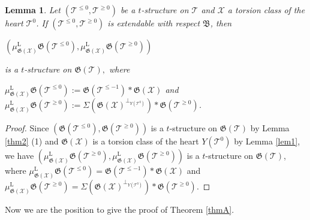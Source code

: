 \documentclass[11pt,a4paper]{amsart}
\numberwithin{equation}{section} \theoremstyle{plain}
\newtheorem{lem}{Lemma}[section]
\numberwithin{equation}{section} \theoremstyle{definition}
\begin{document}
\begin{lem}\label{lem3}  Let $(\mathcal{T}^{\leq0},\mathcal{T}^{\geq0})$ be a $t$-structure on $\mathcal{T}$ and $\mathcal{X}$ a torsion class of the heart $\mathcal{T}^{0}$. If $(\mathcal{T}^{\leq0},\mathcal{T}^{\geq0})$ is extendable with respect $\mathfrak{B}$, then
\begin{center}
$(\mu^{\mathrm{L}}_{\mathfrak{G}(\mathcal{X})}\mathfrak{G}(\mathcal{T}^{\leq0}),\mu^{\mathrm{L}}_{\mathfrak{G}(\mathcal{X})}\mathfrak{G}(\mathcal{T}^{\geq0}))$ \end{center}is a $t$-structure on $\mathfrak{G}(\mathcal{T}),$
where
\begin{center}
$\mu^{\mathrm{L}}_{\mathfrak{G}(\mathcal{X})}\mathfrak{G}(\mathcal{T}^{\leq0}):=\mathfrak{G}(\mathcal{T}^{\leq-1})*\mathfrak{G}(\mathcal{X})$ and $\mu^{\mathrm{L}}_{\mathfrak{G}(\mathcal{X})}\mathfrak{G}(\mathcal{T}^{\geq0}):=\Sigma(\mathfrak{G}(\mathcal{X})^{\perp_{Y(\mathcal{T}^{0})}})*\mathfrak{G}(\mathcal{T}^{\geq0})$.
\end{center}
\end{lem}
\begin{proof} Since $(\mathfrak{G}(\mathcal{T}^{\leq0}),\mathfrak{G}(\mathcal{T}^{\geq0}))$ is a $t$-structure on $\mathfrak{G}(\mathcal{T})$ by Lemma \ref{thm2} (1) and $\mathfrak{G}(\mathcal{X})$ is a torsion class of the heart $Y(\mathcal{T}^{0})$ by Lemma \ref{lem1}, we have $(\mu^{\mathrm{L}}_{\mathfrak{G}(\mathcal{X})}\mathfrak{G}(\mathcal{T}^{\geq0}),\mu^{\mathrm{L}}_{\mathfrak{G}(\mathcal{X})}\mathfrak{G}(\mathcal{T}^{\geq0}))$ is a $t$-structure on $\mathfrak{G}(\mathcal{T})$, where
$\mu^{\mathrm{L}}_{\mathfrak{G}(\mathcal{X})}\mathfrak{G}(\mathcal{T}^{\leq0})=\mathfrak{G}(\mathcal{T}^{\leq-1})*\mathfrak{G}(\mathcal{X})$ and $\mu^{\mathrm{L}}_{\mathfrak{G}(\mathcal{X})}\mathfrak{G}(\mathcal{T}^{\geq0})=\Sigma(\mathfrak{G}(\mathcal{X})^{\perp_{Y(\mathcal{T}^{0})}})*\mathfrak{G}(\mathcal{T}^{\geq0})$.
\end{proof}


Now we are the position to give the proof of Theorem \ref{thmA}.
\end{document}
